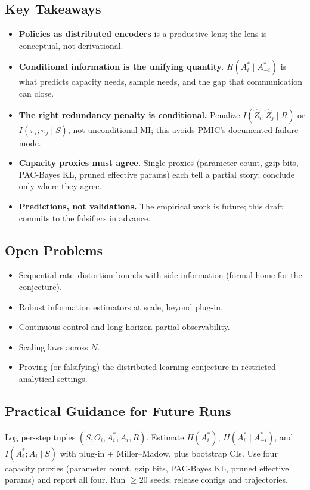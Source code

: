 \documentclass[10pt, letterpaper]{article}
\begin{document}
\subsection*{Key Takeaways}
\begin{itemize}
    \item \textbf{Policies as distributed encoders} is a productive lens; the lens is conceptual, not derivational.
    \item \textbf{Conditional information is the unifying quantity.} $H(A_i^*\mid A_{-i}^*)$ is what predicts capacity needs, sample needs, and the gap that communication can close.
    \item \textbf{The right redundancy penalty is conditional.} Penalize $I(\hat{Z}_i; \hat{Z}_j \mid R)$ or $I(\pi_i; \pi_j \mid S)$, not unconditional MI; this avoids PMIC's documented failure mode.
    \item \textbf{Capacity proxies must agree.} Single proxies (parameter count, gzip bits, PAC-Bayes KL, pruned effective params) each tell a partial story; conclude only where they agree.
    \item \textbf{Predictions, not validations.} The empirical work is future; this draft commits to the falsifiers in advance.
\end{itemize}

\subsection*{Open Problems}
\begin{itemize}
    \item Sequential rate--distortion bounds with side information (formal home for the conjecture).
    \item Robust information estimators at scale, beyond plug-in.
    \item Continuous control and long-horizon partial observability.
    \item Scaling laws across $N$.
    \item Proving (or falsifying) the distributed-learning conjecture in restricted analytical settings.
\end{itemize}

\subsection*{Practical Guidance for Future Runs}

Log per-step tuples $(S, O_i, A_i^*, A_i, R)$. Estimate $H(A_i^*)$, $H(A_i^*\mid A_{-i}^*)$, and $I(A_i^*; A_i\mid S)$ with plug-in + Miller--Madow, plus bootstrap CIs. Use four capacity proxies (parameter count, gzip bits, PAC-Bayes KL, pruned effective params) and report all four. Run $\geq 20$ seeds; release configs and trajectories.
\end{document}

